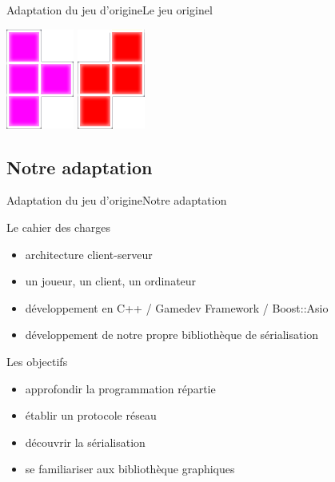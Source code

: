 \documentclass[french]{beamer}
\begin{document}
\begin{frame}{Adaptation du jeu d'origine}{Le jeu originel}
\begin{center}
		\includegraphics[scale=0.3]{img/6.png}
		\includegraphics[scale=0.3]{img/7.png}
	\end{center}
\end{frame}

	\subsection{Notre adaptation}

\begin{frame}{Adaptation du jeu d'origine}{Notre adaptation}
	
	\begin{block}{Le cahier des charges}
		\begin{itemize}
			\item architecture client-serveur
			\item un joueur, un client, un ordinateur
			\item développement en C++ / Gamedev Framework / Boost::Asio
			\item développement de notre propre bibliothèque de sérialisation
		\end{itemize}
	\end{block}
	
	\begin{block}{Les objectifs}
		\begin{itemize}
			\item approfondir la programmation répartie
			\item établir un protocole réseau
			\item découvrir la sérialisation
			\item se familiariser aux bibliothèque graphiques
		\end{itemize}
	\end{block}

\end{frame}
\end{document}
